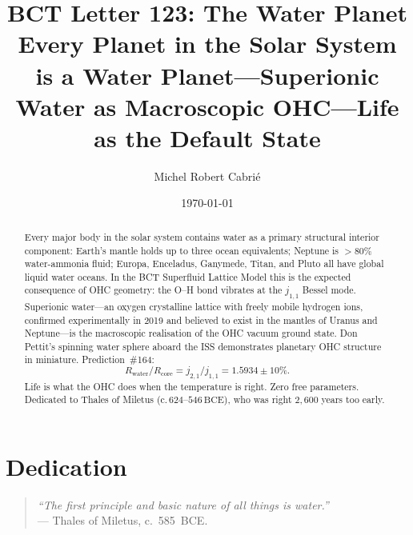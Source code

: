 \documentclass[aps,prl,twocolumn,superscriptaddress,floatfix]{revtex4-2}
\begin{document}
\title{BCT Letter 123: The Water Planet\\
\large Every Planet in the Solar System is a Water Planet---Superionic
Water as Macroscopic OHC---Life as the Default State}

\author{Michel Robert Cabri\'{e}}
\date{\today}

\begin{abstract}
Every major body in the solar system contains water as a primary
structural interior component: Earth's mantle holds up to three ocean
equivalents; Neptune is $>80\%$ water-ammonia fluid; Europa, Enceladus,
Ganymede, Titan, and Pluto all have global liquid water oceans.
In the BCT Superfluid Lattice Model this is the expected consequence of
OHC geometry: the O--H bond vibrates at the $j_{1,1}$ Bessel mode.
Superionic water---an oxygen crystalline lattice with freely mobile
hydrogen ions, confirmed experimentally in 2019 and believed to exist
in the mantles of Uranus and Neptune---is the macroscopic realisation
of the OHC vacuum ground state. Don Pettit's spinning water sphere
aboard the ISS demonstrates planetary OHC structure in miniature.
Prediction~\#164:
\begin{equation*}
R_\mathrm{water}/R_\mathrm{core}
= j_{2,1}/j_{1,1} = 1.5934\pm 10\%.
\end{equation*}
Life is what the OHC does when the temperature is right.
Zero free parameters.
Dedicated to Thales of Miletus ($\text{c.}\,624$--$546\,\mathrm{BCE}$),
who was right $2{,}600$ years too early.
\end{abstract}

\maketitle

\section{Dedication}

\begin{quotation}
\noindent\textit{``The first principle and basic nature of all
things is water.''}\\
\hfill --- Thales of Miletus, c.~585~BCE.
\end{quotation}
\end{document}
